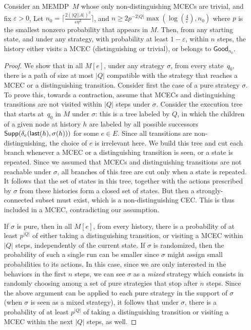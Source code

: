 \documentclass[a4paper,USenglish,cleveref, autoref, thm-restate]{lipics-v2021}
\let\epsilon\varepsilon
\def\abs#1{\ensuremath{\lvert #1 \rvert}}
\newcommand\Supp{\textrm{\sf Supp}}
\newcommand{\last}{\operatorname{\mathsf{last}}}
\def\Good{\textsf{Good}}
\def\Act{A}
\begin{document}
  \begin{lemma}
    \label{lemma:avoiding-cecs}
    Consider an MEMDP~$M$ whose only non-distinguishing MCECs are trivial, and fix $\epsilon>0$, 
    Let $n_0 = \lceil\frac{2(\abs{Q}\abs{\Act})^3}{\epsilon\eta^2} \rceil$, and 
    $n \geq 2 p^{-2\abs{Q}} \max(\log(\frac{4}{\epsilon}),  n_0)$
    where $p$ is the smallest nonzero probability that appears in $M$.
    Then, from any starting state, and under any strategy, with probability at least $1-\epsilon$,
    within $n$ steps, the history either visits a MCEC
    (distinguishing or trivial), or belongs to $\Good_{n_0}$.
  \end{lemma}

\begin{proof}
  We show that in all $M[e]$, under any strategy $\sigma$, from every state~$q_0$, there is a path of size at most $\abs{Q}$ compatible with the strategy that 
  reaches a MCEC or a distinguishing transition. 
  Consider first the case of a pure strategy $\sigma$.
  To prove this, towards a contraction, assume that MCECs and distinguishing transitions are not visited within $\abs{Q}$ steps under $\sigma$. Consider the execution tree that starts at~$q_0$ in $M$ under $\sigma$:
  this is a tree labeled by $Q$, in which the children of a given node at history $h$ are labeled by all possible successors $\Supp(\delta_e(\last(h),\sigma(h)))$ for some $e\in E$.
  Since all transitions are non-distinguishing, the choice of $e$ is irrelevant here.
  We build this tree and cut each branch whenever a MCEC or a distinguishing transition is seen, or a state is repeated.
  Since we assumed that MCECs and distinguishing transitions are not reachable under $\sigma$, all branches of this tree are cut only when a state is repeated.
  It follows that the set of states in this tree, together with the actions prescribed by $\sigma$ from these histories
  form a closed set of states. But then a strongly-connected subset must exist, which is a non-distinguishing CEC. This is thus included in a MCEC,  
  contradicting our assumption.
  
  If $\sigma$ is pure, then in all $M[e]$, from every history, there is a probability of at least $p^{\abs{Q}}$ of either taking a distinguishing transition,
  or visiting a MCEC within $\abs{Q}$ steps, independently of the current state. 
  If $\sigma$ is randomized, then the probability of such a single run can be smaller since $\sigma$ might assign small probabilities to its actions.
  In this case, since we are only interested in the behaviors in the first $n$ steps, we can see $\sigma$ as a \emph{mixed} strategy which consists in randomly choosing
  among a set of pure strategies that stop after $n$ steps.
  Since the above argument can be applied to each pure strategy in the support of $\sigma$ (when $\sigma$ is seen as a mixed strategy), it follows that under $\sigma$,
  there is a probability of at least $p^{\abs{Q}}$ of taking a distinguishing transition
  or visiting a MCEC within the next $\abs{Q}$ steps, as well. 


\end{proof}
\end{document}
